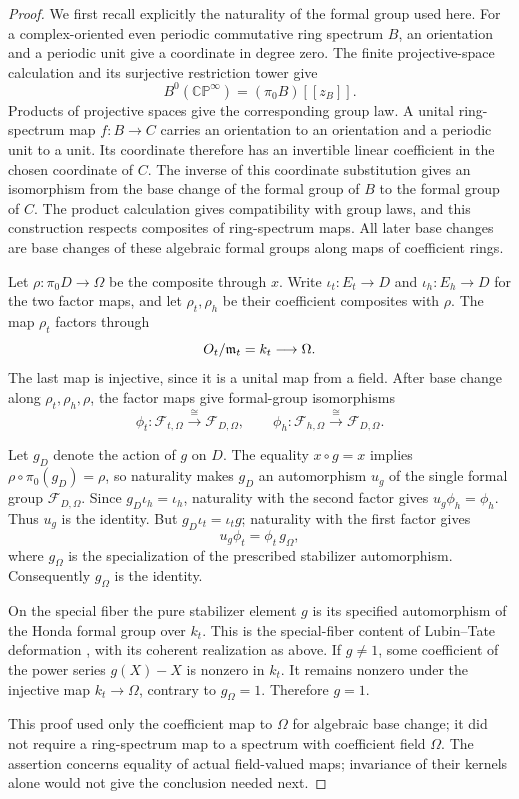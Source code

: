 \begin{proof}
We first recall explicitly the naturality of the formal group used
here. For a complex-oriented even periodic commutative ring
spectrum \(B\), an orientation and a periodic unit give a coordinate
in degree zero. The finite projective-space calculation and its
surjective restriction tower give
\[
 B^0(\mathbb{CP}^{\infty})=(\pi_0B)[[z_B]].
\]
Products of projective spaces give the corresponding group law.
A unital ring-spectrum map \(f:B\to C\) carries an orientation
to an orientation and a periodic unit to a unit. Its coordinate
therefore has an invertible linear coefficient in the chosen
coordinate of \(C\). The inverse of this coordinate substitution
gives an isomorphism from the base change of the formal group of
\(B\) to the formal group of \(C\).
The product calculation gives compatibility with group laws,
and this construction respects composites of ring-spectrum maps.
All later base changes are base changes of these algebraic formal
groups along maps of coefficient rings.

Let \(\rho:\pi_0D\to\Omega\) be the composite through \(x\).
Write \(\iota_t:E_t\to D\) and \(\iota_h:E_h\to D\) for the
two factor maps, and let \(\rho_t,\rho_h\) be their coefficient
composites with \(\rho\). The map \(\rho_t\) factors through
\[
 O_t/\mathfrak m_t=k_t\longrightarrow\Omega.
\]
The last map is injective, since it is a unital map from a field.
After base change along \(\rho_t,\rho_h,\rho\), the factor maps
give formal-group isomorphisms
\[
 \phi_t:\mathcal F_{t,\Omega}\xrightarrow{\ \cong\ }
              \mathcal F_{D,\Omega},\qquad
 \phi_h:\mathcal F_{h,\Omega}\xrightarrow{\ \cong\ }
              \mathcal F_{D,\Omega}.
\]

Let \(g_D\) denote the action of \(g\) on \(D\).
The equality \(x\circ g=x\) implies
\(\rho\circ\pi_0(g_D)=\rho\), so naturality makes \(g_D\) an
automorphism \(u_g\) of the single formal group
\(\mathcal F_{D,\Omega}\). Since \(g_D\iota_h=\iota_h\),
naturality with the second factor gives \(u_g\phi_h=\phi_h\).
Thus \(u_g\) is the identity. But \(g_D\iota_t=\iota_t g\);
naturality with the first factor gives
\[
 u_g\phi_t=\phi_t\,g_\Omega,
\]
where \(g_\Omega\) is the specialization of the prescribed
stabilizer automorphism. Consequently \(g_\Omega\) is the identity.

On the special fiber the pure stabilizer element \(g\) is its
specified automorphism of the Honda formal group over \(k_t\).
This is the special-fiber content of Lubin--Tate deformation
\cite[Proposition~3.3 and paragraph~3.4]{lubin-tate1966}, with its
coherent realization as above. If \(g\ne1\), some coefficient of
the power series \(g(X)-X\) is nonzero in \(k_t\). It remains
nonzero under the injective map \(k_t\to\Omega\), contrary to
\(g_\Omega=1\). Therefore \(g=1\).

This proof used only the coefficient map to \(\Omega\) for algebraic
base change; it did not require a ring-spectrum map to a spectrum
with coefficient field \(\Omega\). The assertion concerns equality
of actual field-valued maps; invariance of their kernels alone
would not give the conclusion needed next.
\end{proof}

